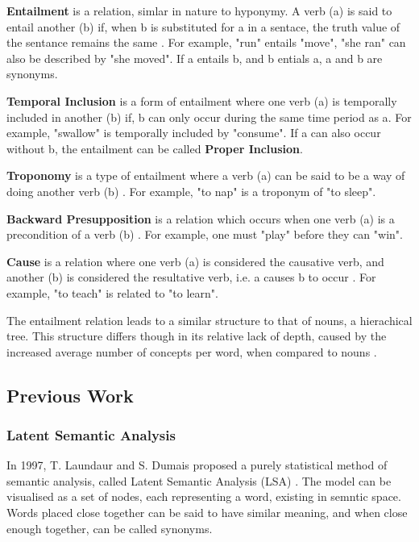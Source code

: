 \documentclass[]{article}
\begin{document}
\textbf{Entailment} is a relation, simlar in nature to hyponymy. A verb (a) is said to entail another (b) if, when b is substituted for a in a sentace, the truth value of the sentance remains the same \cite{WN4Verbs}. For example, "run" entails "move", "she ran" can also be described by "she moved". If a entails b, and b entials a, a and b are synonyms.

\textbf{Temporal Inclusion} is a form of entailment where one verb (a) is temporally included in another (b) if, b can only occur during the same time period as a\cite{WN4Verbs}. For example, "swallow" is temporally included by "consume". If a can also occur without b, the entailment can be called \textbf{Proper Inclusion}.

\textbf{Troponomy} is a type of entailment where a verb (a) can be said to be a way of doing another verb (b) \cite{WN4Verbs}. For example, "to nap" is a troponym of "to sleep". 

\textbf{Backward Presupposition} is a relation which occurs when one verb (a)  is a precondition of a verb (b) \cite{WN4Verbs}. For example, one must "play" before they can "win".

\textbf{Cause} is a relation where one verb (a) is considered the causative verb, and another (b) is considered the resultative verb, i.e. a causes b to occur \cite{WN4Verbs}. For example, "to teach" is related to "to learn".

The entailment relation leads to a similar structure to that of nouns, a hierachical tree. This structure differs though in its relative lack of depth, caused by the increased average number of concepts per word, when compared to nouns \cite{WN4Verbs}. 

\subsection{Previous Work}
\label{sec:PrevWork}

\subsubsection{Latent Semantic Analysis}
\label{sec:LSA}
In 1997, T. Laundaur and S. Dumais proposed a purely statistical method of semantic analysis, called Latent Semantic Analysis (LSA) \cite{LatentSemanticAnalysis}. The model can be visualised as a set of nodes, each representing a word, existing in semntic space. Words placed close together can be said to have similar meaning, and when close enough together, can be called synonyms. 
\end{document}
